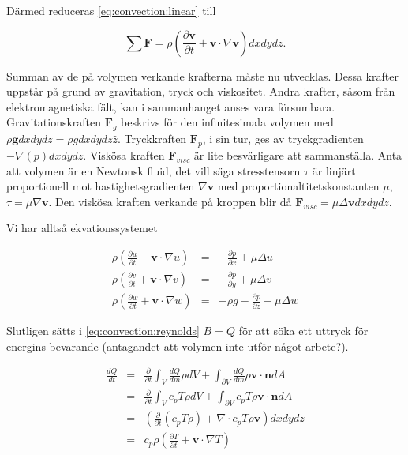Därmed reduceras \eqref{eq:convection:linear} till

\begin{equation}
\label{eq:convection:linearfinal}
\sum \mathbf{F} = \rho \left( \frac{\partial \mathbf{v}}{\partial t} + \mathbf{v}\cdot \nabla\mathbf{v} \right)dxdydz.
\end{equation}

Summan av de på volymen verkande krafterna måste nu utvecklas. Dessa krafter uppstår på grund av gravitation, tryck och viskositet. Andra krafter, såsom från elektromagnetiska fält, kan i sammanhanget anses vara försumbara. Gravitationskraften $\mathbf{F}_g$ beskrivs för den infinitesimala volymen med $\rho \mathbf{g} dxdydz = \rho g dxdydz \hat{z}$. Tryckkraften $\mathbf{F}_p$, i sin tur, ges av tryckgradienten $-\nabla \left( p \right) dxdydz$. Viskösa kraften $\mathbf{F}_{visc}$ är lite besvärligare att sammanställa. Anta att volymen är en Newtonsk fluid, det vill säga stresstensorn $\tau$ är linjärt proportionell mot hastighetsgradienten $\nabla\mathbf{v}$ med proportionaltitetskonstanten $\mu$, $\tau = \mu \nabla \mathbf{v}$. Den viskösa kraften verkande på kroppen blir då $\mathbf{F}_{visc} = \mu\Delta\mathbf{v}dxdydz$.


Vi har alltså ekvationssystemet

\begin{eqnarray}
\label{eq:convection:momentum}
\rho\left(\frac{\partial u}{\partial t} + \mathbf{v}\cdot \nabla u\right) & = & -\frac{\partial p}{\partial x} + \mu\Delta u \nonumber\\
\rho\left(\frac{\partial v}{\partial t} + \mathbf{v}\cdot \nabla v\right) & = & -\frac{\partial p}{\partial y} + \mu\Delta v\\
\rho\left(\frac{\partial w}{\partial t} + \mathbf{v}\cdot \nabla w\right) & = & -\rho g -\frac{\partial p}{\partial z} + \mu\Delta w\nonumber
\end{eqnarray}


Slutligen sätts i \ref{eq:convection:reynolds} $B=Q$ för att söka ett uttryck för energins bevarande (antagandet att volymen inte utför något arbete?).

\begin{eqnarray}
\label{reynoldsenergyone}
\frac{dQ}{dt} & = & \frac{\partial}{\partial t} \int_V \frac{dQ}{dm}\rho dV + \int_{\partial V}\frac{dQ}{dm}\rho \mathbf{v} \cdot \mathbf{n} dA \nonumber\\
& = & \frac{\partial}{\partial t} \int_V c_p T \rho dV + \int_{\partial V} c_p T \rho \mathbf{v} \cdot \mathbf{n} dA \nonumber\\
& = & \left(\frac{\partial}{\partial t} \left( c_p T \rho \right) + \nabla\cdot c_p T \rho \mathbf{v}\right) dxdydz \nonumber\\
& = & c_p \rho \left( \frac{\partial T}{\partial t} + \mathbf{v}\cdot \nabla T\right)
\end{eqnarray}

